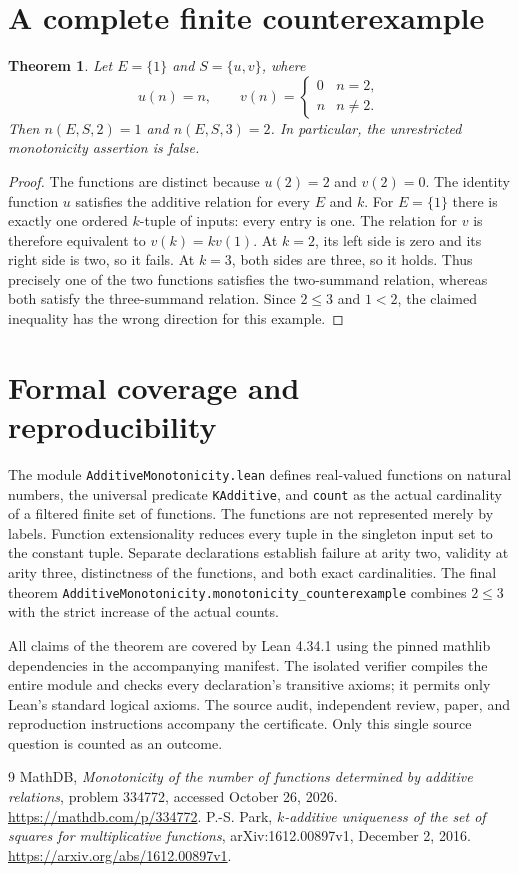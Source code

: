 \documentclass[11pt]{article}
\newtheorem{theorem}{Theorem}
\begin{document}
\newpage
\section{A complete finite counterexample}
\begin{theorem}
Let $E=\{1\}$ and $S=\{u,v\}$, where
\[
 u(n)=n,\qquad
 v(n)=\begin{cases}0&n=2,\\n&n\ne2.\end{cases}
\]
Then $n(E,S,2)=1$ and $n(E,S,3)=2$. In particular, the unrestricted
monotonicity assertion is false.
\end{theorem}
\begin{proof}
The functions are distinct because $u(2)=2$ and $v(2)=0$. The identity
function $u$ satisfies the additive relation for every $E$ and $k$.
For $E=\{1\}$ there is exactly one ordered $k$-tuple of inputs: every
entry is one. The relation for $v$ is therefore equivalent to $v(k)=kv(1)$.
At $k=2$, its left side is zero and its right side is two, so it fails.
At $k=3$, both sides are three, so it holds. Thus precisely one of the two
functions satisfies the two-summand relation, whereas both satisfy the
three-summand relation. Since $2\le3$ and $1<2$, the claimed inequality
has the wrong direction for this example.
\end{proof}

\section{Formal coverage and reproducibility}
The module \texttt{AdditiveMonotonicity.lean} defines real-valued functions
on natural numbers, the universal predicate \texttt{KAdditive}, and
\texttt{count} as the actual cardinality of a filtered finite set of
functions. The functions are not represented merely by labels. Function
extensionality reduces every tuple in the singleton input set to the
constant tuple. Separate declarations establish failure at arity two,
validity at arity three, distinctness of the functions, and both exact
cardinalities. The final theorem
\texttt{AdditiveMonotonicity.monotonicity\_counterexample} combines
$2\le3$ with the strict increase of the actual counts.

All claims of the theorem are covered by Lean 4.34.1 using the pinned
mathlib dependencies in the accompanying manifest. The isolated verifier
compiles the entire module and checks every declaration's transitive
axioms; it permits only Lean's standard logical axioms. The source audit,
independent review, paper, and reproduction instructions accompany the
certificate. Only this single source question is counted as an outcome.

\begin{thebibliography}{9}
 MathDB, \emph{Monotonicity of the number of functions
determined by additive relations}, problem 334772, accessed October 26,
2026. \url{https://mathdb.com/p/334772}.
 P.-S. Park, \emph{$k$-additive uniqueness of the set of squares
for multiplicative functions}, arXiv:1612.00897v1, December 2, 2016.
\url{https://arxiv.org/abs/1612.00897v1}.
\end{thebibliography}
\end{document}
